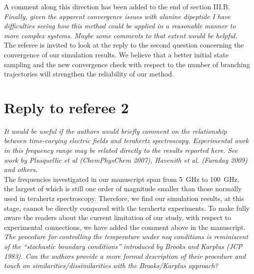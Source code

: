 \documentclass[]{revtex4-1}
\begin{document}
A comment along this direction has been added to the end of section III.B.
\\

\emph{Finally, given the apparent convergence issues with alanine
  dipeptide I have difficulties seeing how this method could be
  applied in a reasonable manner to more complex systems. Maybe some
  comments to that extent would be helpful.  }\\


The referee is invited to look at the reply to the second question concerning the convergence
of our simulation results. We believe that a better initial
state sampling and the new convergence check with respect to the
number of branching trajectories will strengthen the reliability
of our method.






\section*{Reply to referee 2}

\emph{
It would be useful if the authors would briefly comment on the
relationship between time-varying electric fields and terahertz
spectroscopy. Experimental work in this frequency range may be related
directly to the results reported here. See work by Plusquellic et al
(ChemPhysChem 2007), Havenith et al. (Faraday 2009) and others.
}\\

The frequencies investigated in our manuscript span from 5~GHz to 100~GHz,
the largest of which is still one order of magnitude smaller than those normally used in  terahertz spectroscopy. Therefore, we find our simulation results, at this stage, cannot be directly compared with the terahertz experiments.
{To make fully aware the readers about the current limitation of our study, with respect to experimental connections, we have added the comment above in the manuscript.}
\\

\emph{ The procedure for controlling the temperature under neq
  conditions is reminiscent of the ``stochastic boundary conditions''
  introduced by Brooks and Karplus (JCP 1983). Can the authors provide
  a more formal description of their procedure and touch on
  similarities/dissimilarities with the Brooks/Karplus approach?  }\\
\end{document}
